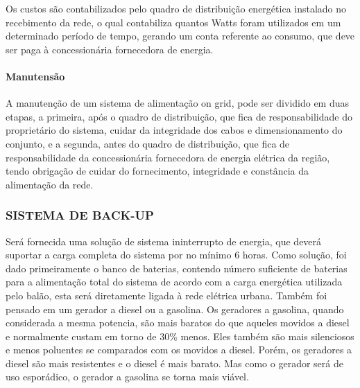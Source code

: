     Os custos são contabilizados pelo quadro de distribuição energética instalado no recebimento da rede, o qual contabiliza quantos Watts foram utilizados em um determinado período de tempo, gerando um conta referente ao consumo, que deve ser paga à concessionária fornecedora de energia.

  \paragraph{Manutensão}
  A manutenção de um sistema de alimentação on grid, pode ser dividido em duas etapas, a primeira, após o quadro de distribuição, que fica de responsabilidade do proprietário do sistema, cuidar da integridade dos cabos e dimensionamento do conjunto, e a segunda, antes do quadro de distribuição, que fica de responsabilidade da concessionária fornecedora de energia elétrica da região, tendo obrigação de cuidar do fornecimento, integridade e constância da alimentação da rede.
  
  \subsubsection{SISTEMA DE BACK-UP}
    Será fornecida uma solução de sistema ininterrupto de energia, que deverá suportar a carga completa do sistema por no mínimo 6 horas.
    Como solução, foi dado primeiramente o banco de baterias, contendo número suficiente de baterias para a alimentação total do sistema de acordo com a carga energética utilizada pelo balão, esta será diretamente ligada à rede elétrica urbana. Também foi pensado em um gerador a diesel ou a gasolina.
    Os geradores a gasolina, quando considerada a mesma potencia, são mais baratos do que aqueles movidos a diesel e normalmente custam em torno de 30\% menos. Eles também são mais silenciosos e menos poluentes se comparados com os movidos a diesel. Porém, os geradores a diesel são mais resistentes e o diesel é mais barato. Mas como o gerador será de uso esporádico, o gerador a gasolina se torna mais viável.
